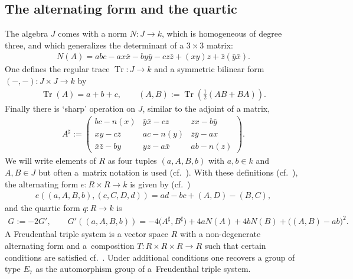\documentclass[10pt,a4paper]{amsart}
\numberwithin{equation}{section}
\begin{document}
\subsection{The alternating form and the quartic}\label{jor2}
The algebra $J$ comes with a norm $N\colon J\rightarrow k$, which is homogeneous of degree three, and which generalizes the determinant of a $3\times 3$ matrix:
\begin{gather*}
N(A) = abc - ax\bar{x} - by\bar{y} - cz\bar{z} + (xy)z + \bar{z}(\bar{y}\bar{x}).
\end{gather*}
One defines the regular trace $\operatorname{Tr}\colon J\rightarrow k$ and a symmetric bilinear form $(-,-)\colon J\times J\rightarrow k$ by
\begin{gather*}
\operatorname{Tr}(A) = a+b+c,\qquad (A,B) := \operatorname{Tr}\left( \tfrac{1}{2} (AB+BA)\right).
\end{gather*}
Finally there is `sharp' operation on $J$, similar to the adjoint of a matrix,
\begin{gather*}
A^\sharp := \begin{pmatrix}
bc-n(x)&\bar{y}\bar{x}-cz&zx-b\bar{y}\\xy-c\bar{z}&ac-n(y)&\bar{z}\bar{y}-ax\\
\bar{x}\bar{z}-by&yz-a\bar{x}&ab-n(z)\end{pmatrix}.
\end{gather*}
We will write elements of $R$ as four tuples $(a,A,B,b)$ with $a,b\in k$ and $A,B\in J$ but often a~matrix notation is used (cf.\ \cite[equation~(29)]{Kru}). With these definitions (cf.\ \cite[Section~2.4]{Kru}), the alternating form $e\colon R\times R\rightarrow k$ is given by (cf.\ \cite[Section~3.1]{Kru})
\begin{gather*}
e((a,A,B,b),(c,C,D,d)) = ad - bc+(A,D) - (B,C),
\end{gather*}
and the quartic form $q\colon R\rightarrow k$ is
\begin{gather*}
G := -2G',\qquad G'((a,A,B,b)) = -4\big(A^\sharp,B^\sharp\big) + 4aN(A) + 4bN(B) + \big((A,B)-ab\big)^2.
\end{gather*}
A Freudenthal triple system is a vector space $R$ with a non-degenerate alternating form and a~composition $T\colon R\times R\times R\rightarrow R$ such that certain conditions are satisfied cf.\ \cite[Section~3.1]{Kru}. Under additional conditions one recovers a group of type $E_7$ as the automorphism group of a~Freudenthal triple system.
\end{document}
